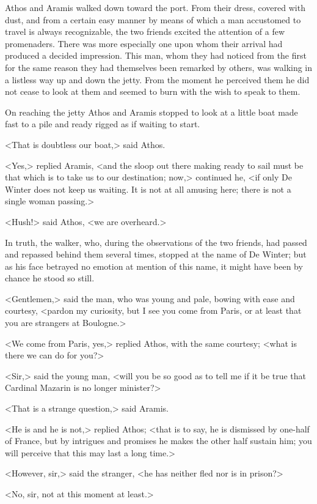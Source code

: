 Athos and Aramis walked down toward the port. From their dress, covered with dust, and from a certain easy manner by means of which a man accustomed to travel is always recognizable, the two friends excited the attention of a few promenaders. There was more especially one upon whom their arrival had produced a decided impression. This man, whom they had noticed from the first for the same reason they had themselves been remarked by others, was walking in a listless way up and down the jetty. From the moment he perceived them he did not cease to look at them and seemed to burn with the wish to speak to them.

On reaching the jetty Athos and Aramis stopped to look at a little boat made fast to a pile and ready rigged as if waiting to start.

<That is doubtless our boat,> said Athos.

<Yes,> replied Aramis, <and the sloop out there making ready to sail must be that which is to take us to our destination; now,> continued he, <if only De Winter does not keep us waiting. It is not at all amusing here; there is not a single woman passing.>

<Hush!> said Athos, <we are overheard.>

In truth, the walker, who, during the observations of the two friends, had passed and repassed behind them several times, stopped at the name of De Winter; but as his face betrayed no emotion at mention of this name, it might have been by chance he stood so still.

<Gentlemen,> said the man, who was young and pale, bowing with ease and courtesy, <pardon my curiosity, but I see you come from Paris, or at least that you are strangers at Boulogne.>

<We come from Paris, yes,> replied Athos, with the same courtesy; <what is there we can do for you?>

<Sir,> said the young man, <will you be so good as to tell me if it be true that Cardinal Mazarin is no longer minister?>

<That is a strange question,> said Aramis.

<He is and he is not,> replied Athos; <that is to say, he is dismissed by one-half of France, but by intrigues and promises he makes the other half sustain him; you will perceive that this may last a long time.>

<However, sir,> said the stranger, <he has neither fled nor is in prison?>

<No, sir, not at this moment at least.>

